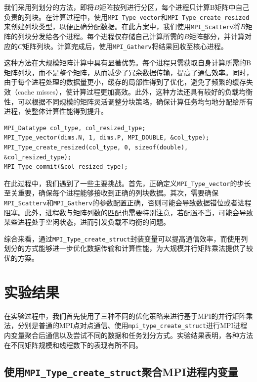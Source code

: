 \documentclass[a4paper, utf8]{ctexart}
\begin{document}
	我们采用列划分的方法，即将$B$矩阵按列进行分区，每个进程只计算B矩阵中自己负责的列块。在计算过程中，使用\verb|MPI_Type_vector|和\verb|MPI_Type_create_resized|来创建列块类型，以便正确分配数据。在此方案中，我们使用\verb|MPI_Scatterv|将$B$矩阵的列块分发给各个进程。每个进程仅存储自己计算所需的$B$矩阵部分，并计算对应的$C$矩阵列块。计算完成后，使用\verb|MPI_Gatherv|将结果回收至核心进程。
	
	这种方法在大规模矩阵计算中具有显著优势。每个进程只需获取自身计算所需的B矩阵列块，而不是整个矩阵，从而减少了冗余数据传输，提高了通信效率。同时，由于每个进程处理的数据量更小，缓存的局部性得到了优化，避免了频繁的缓存失效（cache misses），使计算过程更加高效。此外，这种方法还具有较好的负载均衡性，可以根据不同规模的矩阵灵活调整分块策略，确保计算任务均匀地分配给所有进程，使整体计算性能得到提升。
	
	\begin{verbatim}
MPI_Datatype col_type, col_resized_type;
MPI_Type_vector(dims.N, 1, dims.P, MPI_DOUBLE, &col_type);
MPI_Type_create_resized(col_type, 0, sizeof(double), &col_resized_type);
MPI_Type_commit(&col_resized_type);
	\end{verbatim}
	
	在此过程中，我们遇到了一些主要挑战。首先，正确定义\verb|MPI_Type_vector|的步长至关重要，确保每个进程能够接收到正确的列块数据。其次，需要确保\verb|MPI_Scatterv|和\verb|MPI_Gatherv|的参数配置正确，否则可能会导致数据错位或者进程阻塞。此外，进程数与矩阵列数的匹配也需要特别注意，若配置不当，可能会导致某些进程处于空闲状态，进而引发负载不均衡的问题。
	
	综合来看，通过\verb|MPI_Type_create_struct|封装变量可以提高通信效率，而使用列划分的方式能够进一步优化数据传输和计算性能，为大规模并行矩阵乘法提供了较优的方案。
	
	\section{实验结果}
	
	在实验过程中，我们首先使用了三种不同的优化策略来进行基于MPI的并行矩阵乘法，分别是普通的MPI点对点通信、使用\verb|mpi_type_create_struct|进行MPI进程内变量聚合后通信以及尝试不同的数据和任务划分方式。实验结果表明，各种方法在不同矩阵规模和线程数下的表现有所不同。
	
	\subsection{使用\texttt{MPI\_Type\_create\_struct}聚合MPI进程内变量}
	
\end{document}
